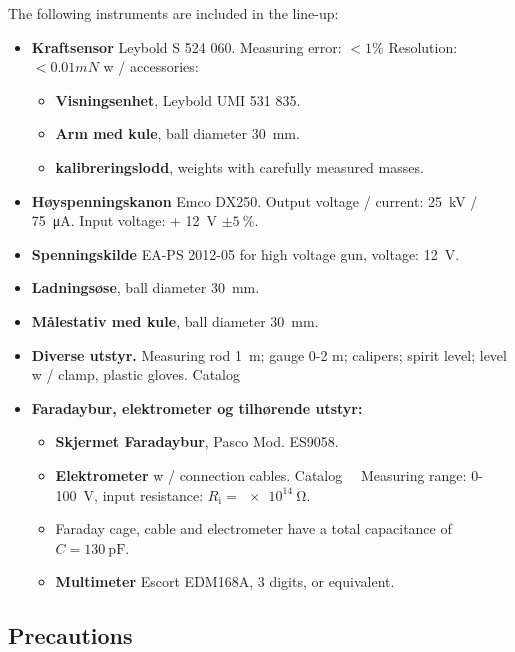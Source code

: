 \documentclass[../Elmag-labhefte-2022.tex]{subfiles}
\begin{document}
\begin{itemize}
The following instruments are included in the line-up:
\vspace{-4mm}
\begin{itemize}
    \item \textbf{Kraftsensor} Leybold S 524 060. Measuring error: $< 1\%$
Resolution: $< 0.01 mN$
    w / accessories:
    \vspace{-2mm}
    \begin{itemize}
        \item \textbf{Visningsenhet}, Leybold UMI 531 835.
        \item \textbf{Arm med kule}, ball diameter \SI{30}{\milli\m}.
        \item \textbf{kalibreringslodd}, weights with carefully measured masses.
    \end{itemize}
    \item \textbf{Høyspenningskanon} Emco DX250. Output voltage / current: \SI{25}{\kilo\volt} / \SI{75}{\micro\ampere}. Input voltage: + \SI{12}{\volt} $\pm \SI{5}{\percent}$.
    \item \textbf{Spenningskilde} EA-PS 2012-05 for high voltage gun, voltage: \SI{12}{\volt}.
    \item \textbf{Ladningsøse}, ball diameter \SI{30}{\milli\m}.
    \item \textbf{Målestativ med kule}, ball diameter \SI{30}{\milli\m}.
    \item \textbf{Diverse utstyr.} Measuring rod \SI{1}{\m}; gauge 0-2 \si{\m}; calipers; spirit level; level w / clamp, plastic gloves.
    Catalog \item \textbf{Faradaybur, elektrometer og tilhørende utstyr:}
    \vspace{-2mm}
    \begin{itemize}
        \item \textbf{Skjermet Faradaybur}, Pasco Mod. ES9058.
        \item \textbf{Elektrometer} w / connection cables. Catalog \ \
              Measuring range: 0- \SI{100}{\volt}, input resistance: $R_\text{i} = \SI{e14}{\ohm}$.
        \item Faraday cage, cable and electrometer have a total capacitance of $C = \SI{130}{\pico\farad}$.
        \item \textbf{Multimeter} Escort EDM168A, 3 digits, or equivalent.
    \end{itemize}
\end{itemize}

\subsection{Precautions}


\end{itemize}
\end{document}
